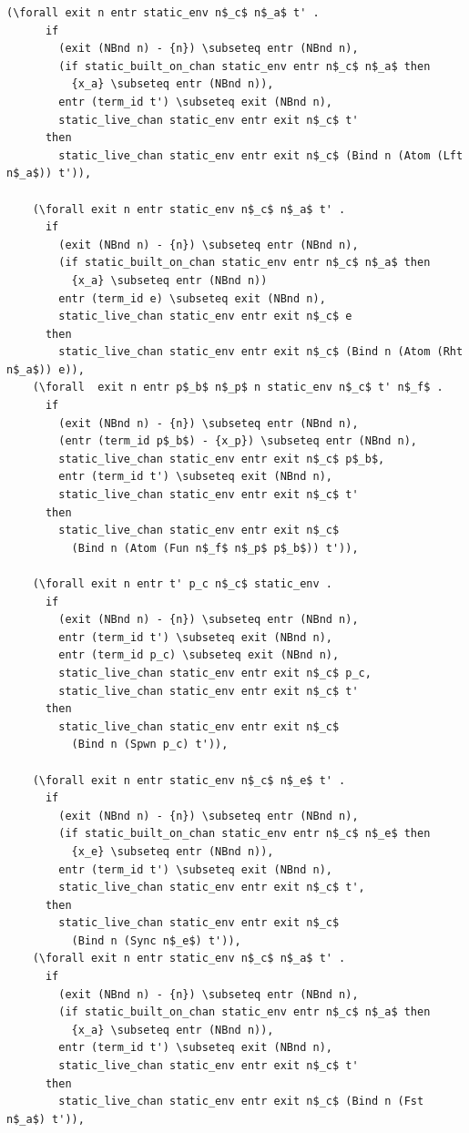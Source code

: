 \documentclass[10pt]{article}
\begin{document}
\begin{lstlisting}[language=logic, mathescape]
    (\forall exit n entr static_env n$_c$ n$_a$ t' . 
      if
        (exit (NBnd n) - {n}) \subseteq entr (NBnd n),
        (if static_built_on_chan static_env entr n$_c$ n$_a$ then
          {x_a} \subseteq entr (NBnd n)),
        entr (term_id t') \subseteq exit (NBnd n),
        static_live_chan static_env entr exit n$_c$ t'
      then
        static_live_chan static_env entr exit n$_c$ (Bind n (Atom (Lft n$_a$)) t')),

    (\forall exit n entr static_env n$_c$ n$_a$ t' . 
      if
        (exit (NBnd n) - {n}) \subseteq entr (NBnd n),
        (if static_built_on_chan static_env entr n$_c$ n$_a$ then
          {x_a} \subseteq entr (NBnd n))
        entr (term_id e) \subseteq exit (NBnd n),
        static_live_chan static_env entr exit n$_c$ e
      then
        static_live_chan static_env entr exit n$_c$ (Bind n (Atom (Rht n$_a$)) e)),
    (\forall  exit n entr p$_b$ n$_p$ n static_env n$_c$ t' n$_f$ . 
      if
        (exit (NBnd n) - {n}) \subseteq entr (NBnd n),
        (entr (term_id p$_b$) - {x_p}) \subseteq entr (NBnd n),
        static_live_chan static_env entr exit n$_c$ p$_b$,
        entr (term_id t') \subseteq exit (NBnd n),
        static_live_chan static_env entr exit n$_c$ t'
      then
        static_live_chan static_env entr exit n$_c$
          (Bind n (Atom (Fun n$_f$ n$_p$ p$_b$)) t')),

    (\forall exit n entr t' p_c n$_c$ static_env .
      if
        (exit (NBnd n) - {n}) \subseteq entr (NBnd n),
        entr (term_id t') \subseteq exit (NBnd n),
        entr (term_id p_c) \subseteq exit (NBnd n),
        static_live_chan static_env entr exit n$_c$ p_c,
        static_live_chan static_env entr exit n$_c$ t'
      then
        static_live_chan static_env entr exit n$_c$
          (Bind n (Spwn p_c) t')),

    (\forall exit n entr static_env n$_c$ n$_e$ t' .
      if
        (exit (NBnd n) - {n}) \subseteq entr (NBnd n),
        (if static_built_on_chan static_env entr n$_c$ n$_e$ then
          {x_e} \subseteq entr (NBnd n)),
        entr (term_id t') \subseteq exit (NBnd n),
        static_live_chan static_env entr exit n$_c$ t',
      then
        static_live_chan static_env entr exit n$_c$
          (Bind n (Sync n$_e$) t')),
    (\forall exit n entr static_env n$_c$ n$_a$ t' .
      if
        (exit (NBnd n) - {n}) \subseteq entr (NBnd n),
        (if static_built_on_chan static_env entr n$_c$ n$_a$ then
          {x_a} \subseteq entr (NBnd n)),
        entr (term_id t') \subseteq exit (NBnd n),
        static_live_chan static_env entr exit n$_c$ t'
      then
        static_live_chan static_env entr exit n$_c$ (Bind n (Fst n$_a$) t')),


\end{lstlisting}
\end{document}
